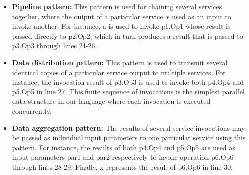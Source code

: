 \documentclass[10pt, conference, compsocconf]{IEEEtran}
\newenvironment{ppl}{\small\ttfamily}{}
\begin{document}
\begin{itemize}
\item \textbf{Pipeline pattern:}
This pattern is used for chaining several services together, where the output of a particular service is used as an input to invoke another.
For instance, \begin{ppl}a\end{ppl} is used to invoke \begin{ppl}p1.Op1\end{ppl} whose result is passed directly to \begin{ppl}p2.Op2\end{ppl}, which in turn produces a result that is passed to \begin{ppl}p3.Op3\end{ppl} through lines 24-26.
\item \textbf{Data distribution pattern:}
This pattern is used to transmit several identical copies of a particular service output to multiple services.
For instance, the invocation result of \begin{ppl}p3.Op3\end{ppl} is used to invoke both \begin{ppl}p4.Op4\end{ppl} and \begin{ppl}p5.Op5\end{ppl} in line 27.
This finite sequence of invocations is the simplest parallel data structure in our language where each invocation is executed concurrently.
\item \textbf{Data aggregation pattern:}
The results of several service invocations may be passed as individual input parameters to one particular service using this pattern.
For instance, the results of both \begin{ppl}p4.Op4\end{ppl} and \begin{ppl}p5.Op5\end{ppl} are used as input parameters \begin{ppl}par1\end{ppl} and \begin{ppl}par2\end{ppl} respectively to invoke operation \begin{ppl}p6.Op6\end{ppl} through lines 28-29.
Finally, \begin{ppl}x\end{ppl} represents the result of \begin{ppl}p6.Op6\end{ppl} in line 30.
\end{itemize}
\end{document}
